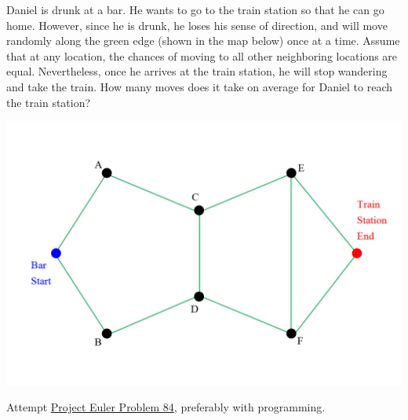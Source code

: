 \begin{Exercise}
Daniel is drunk at a bar. He wants to go to the train station so that he can go home. However, since he is drunk, he loses his sense of direction, and will move randomly along the green edge (shown in the map below) once at a time. Assume that at any location, the chances of moving to all other neighboring locations are equal. Nevertheless, once he arrives at the train station, he will stop wandering and take the train. How many moves does it take on average for Daniel to reach the train station?
\begin{center}
\includegraphics[scale = 0.3]{graphics/wander.png}
\end{center}
\end{Exercise}

\begin{Exercise}
Attempt \href{https://projecteuler.net/problem=84}{Project Euler Problem 84}, preferably with programming.
\end{Exercise}
